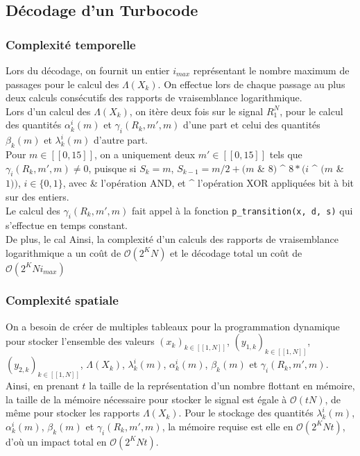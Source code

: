 \documentclass[12pt]{article}
\begin{document}
\subsection{D\'ecodage d'un Turbocode}
\subsubsection{Complexit\'e temporelle}
Lors du d\'ecodage, on fournit un entier $i_{max}$ repr\'esentant le nombre maximum de passages pour le calcul des $\Lambda(X_k)$. On effectue lors de chaque passage au plus deux calculs cons\'ecutifs des rapports de vraisemblance logarithmique.\\
Lors d'un calcul des $\Lambda(X_k)$, on it\`ere deux fois sur le signal $R_1^N$, pour le calcul des quantit\'es $\alpha_k^i(m)$ et $\gamma_i(R_k, m', m)$ d'une part et celui des quantit\'es $\beta_k(m)$ et $\lambda_k^i(m)$ d'autre part.\\
Pour $m \in [\![0, 15]\!]$, on a uniquement deux $m' \in [\![0, 15]\!]$ tels que $\gamma_i(R_k, m', m) \neq 0$, puisque si $S_k = m$, $S_{k-1} = m / 2 + (m$ \& $8)$ \^{} $8*(i$ \^{} $(m$ \& $1))$, $i \in \{0, 1\}$, avec \& l'op\'eration AND, et \^{} l'op\'eration XOR appliqu\'ees bit \`a bit sur des entiers.\\
Le calcul des $\gamma_i(R_k, m', m)$ fait appel \`a la fonction \verb|p_transition(x, d, s)| qui s'effectue en temps constant.\\
De plus, le cal
Ainsi, la complexit\'e d'un calculs des rapports de vraisemblance logarithmique a un co\^ut de $\mathcal{O}(2^KN)$ et le d\'ecodage total un co\^ut de $\mathcal{O}(2^KNi_{max})$


\subsubsection{Complexit\'e spatiale}
On a besoin de cr\'eer de multiples tableaux pour la programmation dynamique pour stocker l'ensemble des valeurs $(x_k)_{k \in [\![1, N]\!]}$, $(y_{1,k})_{k \in [\![1, N]\!]}$, $(y_{2,k})_{k \in [\![1, N]\!]}$, $\Lambda(X_k)$, $\lambda_k^i(m)$, $\alpha_k^i(m)$, $\beta_k(m)$ et $\gamma_i(R_k, m', m)$. Ainsi, en prenant $t$ la taille de la repr\'esentation d'un nombre flottant en m\'emoire, la taille de la m\'emoire n\'ecessaire pour stocker le signal est \'egale \`a $\mathcal{O}(tN)$, de m\^eme pour stocker les rapports $\Lambda(X_k)$. Pour le stockage des quantit\'es $\lambda_k^i(m)$, $\alpha_k^i(m)$, $\beta_k(m)$ et $\gamma_i(R_k, m', m)$, la m\'emoire requise est elle en $\mathcal{O}(2^KNt)$,
d'o\`u un impact total en $\mathcal{O}(2^KNt)$.
\end{document}
